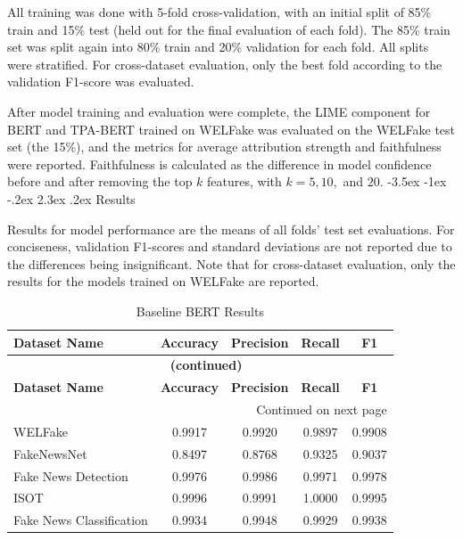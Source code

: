 \documentclass[
]{article}
\makeatletter
\renewcommand\section{\@startsection{section}{1}{\z@}%
  {-3.5ex \@plus -1ex \@minus -.2ex}%
  {2.3ex \@plus .2ex}%
  {\normalfont\fontsize{12}{14}\selectfont\bfseries}}
\makeatother
\begin{document}
All training was done with 5-fold cross-validation, with an initial split of 85\% train and 15\% test (held out for the final evaluation of each fold). The 85\% train set was split again into 80\% train and 20\% validation for each fold. All splits were stratified. For cross-dataset evaluation, only the best fold according to the validation F1-score was evaluated. 

After model training and evaluation were complete, the LIME component for BERT and TPA-BERT trained on WELFake was evaluated on the WELFake test set (the 15\%), and the metrics for average attribution strength and faithfulness were reported. Faithfulness is calculated as the difference in model confidence before and after removing the top $k$ features, with $k = 5, 10,$ and $20$.
\section{Results}

Results for model performance are the means of all folds' test set evaluations. For conciseness, validation F1-scores and standard deviations are not reported due to the differences being insignificant. Note that for cross-dataset evaluation, only the results for the models trained on WELFake are reported.

\begingroup
\setlength{\tabcolsep}{3pt}
\renewcommand{\arraystretch}{1.3}
\setlength\LTleft{0pt}
\setlength\LTright{0pt}
\begin{longtable}{@{} l c c c c @{}}
\caption{Baseline BERT Results} \label{tab:bert_results} \\
\toprule
\textbf{Dataset Name} & \textbf{Accuracy} & \textbf{Precision} & \textbf{Recall} & \textbf{F1} \\
\midrule
\endfirsthead

\multicolumn{5}{c}{{\bfseries \tablename\ \thetable{} (continued)}} \\
\toprule
\textbf{Dataset Name} & \textbf{Accuracy} & \textbf{Precision} & \textbf{Recall} & \textbf{F1} \\
\midrule
\endhead

\bottomrule
\multicolumn{5}{r}{{Continued on next page}} \\
\endfoot

\bottomrule
\endlastfoot
WELFake & 0.9917 & 0.9920 & 0.9897 & 0.9908 \\
FakeNewsNet & 0.8497 & 0.8768 & 0.9325 & 0.9037 \\
Fake News Detection & 0.9976 & 0.9986 & 0.9971 & 0.9978 \\
ISOT & 0.9996 & 0.9991 & 1.0000 & 0.9995 \\
Fake News Classification & 0.9934 & 0.9948 & 0.9929 & 0.9938 \\
\end{longtable}
\endgroup
\end{document}
